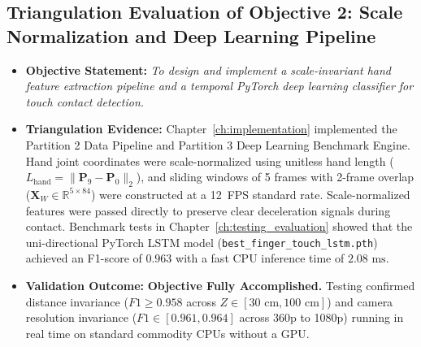 \subsection{Triangulation Evaluation of Objective 2: Scale Normalization and Deep Learning Pipeline}
\label{subsec:concl_obj2}
\begin{itemize}
    \item \textbf{Objective Statement:} \emph{To design and implement a scale-invariant hand feature extraction pipeline and a temporal PyTorch deep learning classifier for touch contact detection.}
    \item \textbf{Triangulation Evidence:} Chapter~\ref{ch:implementation} implemented the Partition 2 Data Pipeline and Partition 3 Deep Learning Benchmark Engine. Hand joint coordinates were scale-normalized using unitless hand length ($L_{\text{hand}} = \|\mathbf{P}_9 - \mathbf{P}_0\|_2$), and sliding windows of 5 frames with 2-frame overlap ($\mathbf{X}_W \in \mathbb{R}^{5 \times 84}$) were constructed at a 12~FPS standard rate. Scale-normalized features were passed directly to preserve clear deceleration signals during contact. Benchmark tests in Chapter~\ref{ch:testing_evaluation} showed that the uni-directional PyTorch LSTM model (\texttt{best\_finger\_touch\_lstm.pth}) achieved an F1-score of $0.963$ with a fast CPU inference time of $2.08\text{ ms}$.
    \item \textbf{Validation Outcome:} \textbf{Objective Fully Accomplished.} Testing confirmed distance invariance ($F1 \ge 0.958$ across $Z \in [30\text{ cm}, 100\text{ cm}]$) and camera resolution invariance ($F1 \in [0.961, 0.964]$ across 360p to 1080p) running in real time on standard commodity CPUs without a GPU.
\end{itemize}

